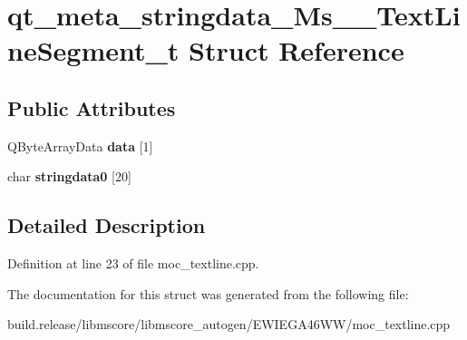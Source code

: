 \hypertarget{structqt__meta__stringdata___ms_____text_line_segment__t}{}\section{qt\+\_\+meta\+\_\+stringdata\+\_\+\+Ms\+\_\+\+\_\+\+Text\+Line\+Segment\+\_\+t Struct Reference}
\label{structqt__meta__stringdata___ms_____text_line_segment__t}
\subsection*{Public Attributes}
\begin{DoxyCompactItemize}
\item 
\mbox{\label{structqt__meta__stringdata___ms_____text_line_segment__t_ab05df112ee0e5f18974e0c6ddc5f9e34}} 
Q\+Byte\+Array\+Data {\bfseries data} \mbox{[}1\mbox{]}
\item 
\mbox{\label{structqt__meta__stringdata___ms_____text_line_segment__t_ac5dc9471781ebba14327a9b2d66032e4}} 
char {\bfseries stringdata0} \mbox{[}20\mbox{]}
\end{DoxyCompactItemize}


\subsection{Detailed Description}


Definition at line 23 of file moc\+\_\+textline.\+cpp.



The documentation for this struct was generated from the following file\+:\begin{DoxyCompactItemize}
\item 
build.\+release/libmscore/libmscore\+\_\+autogen/\+E\+W\+I\+E\+G\+A46\+W\+W/moc\+\_\+textline.\+cpp\end{DoxyCompactItemize}
